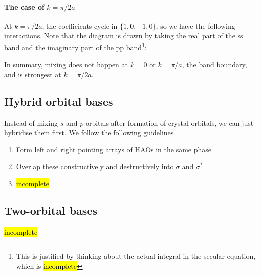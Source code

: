 \paragraph{The case of $k=\pi/2a$}
At $k=\pi/2a$, the coefficients cycle in $\{1,0,-1,0\}$, so we have the following interactions. Note that the diagram is drawn by taking the real part of the ss band and the imaginary part of the pp band\footnote{This is justified by thinking about the actual integral in the secular equation, which is \hl{incomplete}}:
\begin{center}
\end{center}
In summary, mixing does not happen at $k=0$ or $k=\pi/a$, the band boundary, and is strongest at $k=\pi/2a$.
\subsection{Hybrid orbital bases}
Instead of mixing $s$ and $p$ orbitals after formation of crystal orbitals, we can just hybridise them first. We follow the following guidelines
\begin{enumerate}
	\item Form left and right pointing arrays of HAOs in the same phase
	\item Overlap these constructively and destructively into $\sigma$ and $\sigma^*$
	\item \hl{incomplete}
\end{enumerate}
\subsection{Two-orbital bases}
\hl{incomplete}






